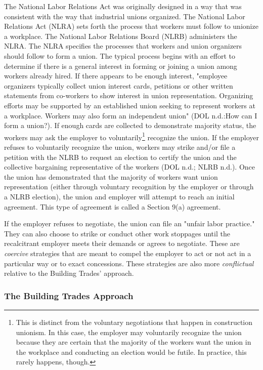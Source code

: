 \documentclass[12pt]{article}
\begin{document}
The National Labor Relations Act was originally designed in a way that was consistent with the way that industrial unions organized. The National Labor Relations Act (NLRA) sets forth the process that workers must follow to unionize a workplace. The National Labor Relations Board (NLRB) administers the NLRA. The NLRA specifies the processes that workers and union organizers should follow to form a union. The typical process begins with an effort to determine if there is a general interest in forming or joining a union among workers already hired. If there appears to be enough interest, "employee organizers typically collect union interest cards, petitions or other written statements from co-workers to show interest in union representation. Organizing efforts may be supported by an established union seeking to represent workers at a workplace. Workers may also form an independent union" (DOL n.d.:How can I form a union?). If enough cards are collected to demonstrate majority status, the workers may ask the employer to voluntarily\footnote{This is distinct from the voluntary negotiations that happen in construction unionism. In this case, the employer may voluntarily recognize the union because they are certain that the majority of the workers want the union in the workplace and conducting an election would be futile. In practice, this rarely happens, though.}  recognize the union. If the employer refuses to voluntarily recognize the union, workers may strike and/or file a petition with the NLRB to request an election to certify the union and the collective bargaining representative of the workers (DOL n.d.; NLRB n.d.). Once the union has demonstrated that the majority of workers want union representation (either through voluntary recognition by the employer or through a NLRB election), the union and employer will attempt to reach an initial agreement. This type of agreement is called a Section 9(a) agreement.

If the employer refuses to negotiate, the union can file an "unfair labor practice." They can also choose to strike or conduct other work stoppages until the recalcitrant employer meets their demands or agrees to negotiate. These are \textit{coercive} strategies that are meant to compel the employer to act or not act in a particular way or to exact concessions. These strategies are also more \textit{conflictual} relative to the Building Trades' approach.

\subsubsection{The Building Trades Approach}
\end{document}
